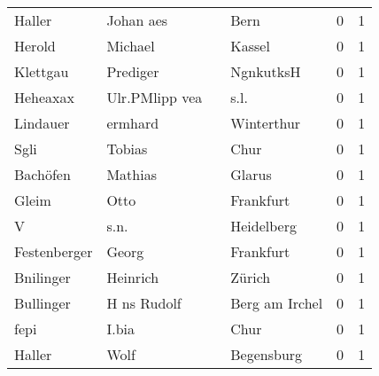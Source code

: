 \documentclass[10pt,a4paper,landscape]{article}
\begin{document}
\begin{longtable}{llllrr}
                   Haller &                          Johan aes &             &                                        Bern &          0 &         1 \\
                   Herold &                            Michael &             &                                      Kassel &          0 &         1 \\
                 Klettgau &                           Prediger &             &                                   NgnkutksH &          0 &         1 \\
                 Heheaxax &                     Ulr.PMlipp vea &             &                                        s.l. &          0 &         1 \\
                 Lindauer &                            ermhard &             &                                  Winterthur &          0 &         1 \\
                     Sgli &                             Tobias &             &                                        Chur &          0 &         1 \\
                 Bachöfen &                            Mathias &             &                                      Glarus &          0 &         1 \\
                    Gleim &                               Otto &             &                                   Frankfurt &          0 &         1 \\
                        V &                               s.n. &             &                                  Heidelberg &          0 &         1 \\
             Festenberger &                              Georg &             &                                   Frankfurt &          0 &         1 \\
                Bnilinger &                           Heinrich &             &                                      Zürich &          0 &         1 \\
                Bullinger &                        H ns Rudolf &             &                              Berg am Irchel &          0 &         1 \\
                     fepi &                              I.bia &             &                                        Chur &          0 &         1 \\
                   Haller &                               Wolf &             &                                  Begensburg &          0 &         1 \\

\end{longtable}
\end{document}
